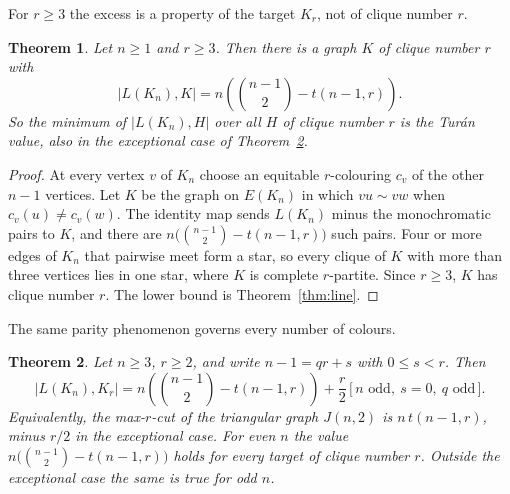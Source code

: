 \documentclass{article}
\newtheorem{theorem}{Theorem}[section]
\theoremstyle{definition}
\begin{document}
For $r\ge3$ the excess is a property of the target $K_r$, not of clique number
$r$.

\begin{theorem}
\label{thm:triangular_general}
Let $n\ge1$ and $r\ge3$.  Then there is a graph $K$ of clique number $r$ with
\[
  |L(K_n),K| = n\left(\binom{n-1}2-t(n-1,r)\right).
\]
So the minimum of $|L(K_n),H|$ over all $H$ of clique number $r$ is the Turán
value, also in the exceptional case of Theorem~\ref{thm:triangular_r}.
\end{theorem}

\begin{proof}
At every vertex $v$ of $K_n$ choose an equitable $r$-colouring $c_v$ of the other
$n-1$ vertices.  Let $K$ be the graph on $E(K_n)$ in which $vu\sim vw$ when
$c_v(u)\ne c_v(w)$.  The identity map sends $L(K_n)$ minus the monochromatic pairs
to $K$, and there are $n\bigl(\binom{n-1}2-t(n-1,r)\bigr)$ such pairs.  Four or
more edges of $K_n$ that pairwise meet form a star, so every clique of $K$ with
more than three vertices lies in one star, where $K$ is complete $r$-partite.
Since $r\ge3$, $K$ has clique number $r$.  The lower bound is
Theorem~\ref{thm:line}.
\end{proof}

The same parity phenomenon governs every number of colours.

\begin{theorem}
\label{thm:triangular_r}
Let $n\ge3$, $r\ge2$, and write $n-1=qr+s$ with $0\le s<r$.  Then
\[
  |L(K_n),K_r| = n\left(\binom{n-1}2-t(n-1,r)\right) + \frac r2\,
  \bigl[\,n \text{ odd},\ s=0,\ q \text{ odd}\,\bigr].
\]
Equivalently, the max-$r$-cut of the triangular graph $J(n,2)$ is
$n\,t(n-1,r)$, minus $r/2$ in the exceptional case.  For even $n$ the value
$n\bigl(\binom{n-1}2-t(n-1,r)\bigr)$ holds for every target of clique number $r$.
Outside the exceptional case the same is true for odd $n$.
\end{theorem}
\end{document}
